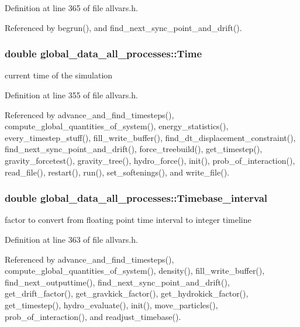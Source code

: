 Definition at line 365 of file allvars.h.



Referenced by begrun(), and find\_\-next\_\-sync\_\-point\_\-and\_\-drift().

\hypertarget{structglobal__data__all__processes_a25b9da73fdcbdc45fbe4a6ad45479f09}{
\subsubsection[{Time}]{\setlength{\rightskip}{0pt plus 5cm}double {\bf global\_\-data\_\-all\_\-processes::Time}}}
\label{structglobal__data__all__processes_a25b9da73fdcbdc45fbe4a6ad45479f09}
current time of the simulation 

Definition at line 355 of file allvars.h.



Referenced by advance\_\-and\_\-find\_\-timesteps(), compute\_\-global\_\-quantities\_\-of\_\-system(), energy\_\-statistics(), every\_\-timestep\_\-stuff(), fill\_\-write\_\-buffer(), find\_\-dt\_\-displacement\_\-constraint(), find\_\-next\_\-sync\_\-point\_\-and\_\-drift(), force\_\-treebuild(), get\_\-timestep(), gravity\_\-forcetest(), gravity\_\-tree(), hydro\_\-force(), init(), prob\_\-of\_\-interaction(), read\_\-file(), restart(), run(), set\_\-softenings(), and write\_\-file().

\hypertarget{structglobal__data__all__processes_a0dd4962a455bb955f04ec271d7af7bb4}{
\subsubsection[{Timebase\_\-interval}]{\setlength{\rightskip}{0pt plus 5cm}double {\bf global\_\-data\_\-all\_\-processes::Timebase\_\-interval}}}
\label{structglobal__data__all__processes_a0dd4962a455bb955f04ec271d7af7bb4}
factor to convert from floating point time interval to integer timeline 

Definition at line 363 of file allvars.h.



Referenced by advance\_\-and\_\-find\_\-timesteps(), compute\_\-global\_\-quantities\_\-of\_\-system(), density(), fill\_\-write\_\-buffer(), find\_\-next\_\-outputtime(), find\_\-next\_\-sync\_\-point\_\-and\_\-drift(), get\_\-drift\_\-factor(), get\_\-gravkick\_\-factor(), get\_\-hydrokick\_\-factor(), get\_\-timestep(), hydro\_\-evaluate(), init(), move\_\-particles(), prob\_\-of\_\-interaction(), and readjust\_\-timebase().

